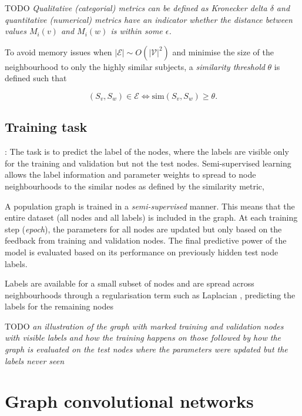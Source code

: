 TODO \textit{Qualitative (categorial) metrics can be defined as Kronecker delta $\delta$ and quantitative (numerical) metrics have an indicator whether the distance between values $M_i(v)$ and $M_i(w)$ is within some $\epsilon$.}

To avoid memory issues when $|\mathcal{E}| \sim O(|\mathcal{V}|^2)$ and minimise the size of the neighbourhood to only the highly similar subjects, a \textit{similarity threshold} $\theta$ is defined such that

\begin{equation}
    (S_v, S_w) \in \mathcal{E} \iff \mathrm{sim}(S_v, S_w) \geq \theta.
\end{equation}

\subsection{Training task}
\cite{kipf2017semi}: The task is to predict the label of the nodes, where the labels are visible only for the training and validation but not the test nodes. Semi-supervised learning allows the label information and parameter weights to spread to node neighbourhoods to the similar nodes as defined by the similarity metric, 


A population graph is trained in a \textit{semi-supervised} manner. This means that the entire dataset (all nodes and all labels) is included in the graph. At each training step (\textit{epoch}), the parameters for all nodes are updated but only based on the feedback from training and validation nodes. The final predictive power of the model is evaluated based on its performance on previously hidden test node labels.

Labels are available for a small subset of nodes and are spread across neighbourhoods through a regularisation term such as Laplacian \cite{kipf2017semi}, predicting the labels for the remaining nodes

TODO \textit{an illustration of the graph with marked training and validation nodes with visible labels and how the training happens on those followed by how the graph is evaluated on the test nodes where the parameters were updated but the labels never seen}


\section{Graph convolutional networks}


